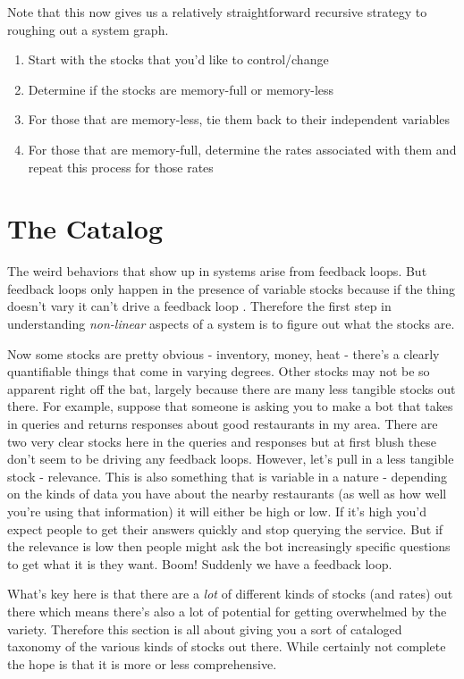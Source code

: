 \documentclass[11pt,a5paper]{book}
\begin{document}
Note that this now gives us a relatively straightforward recursive strategy to roughing out a system graph. 

\begin{enumerate}
\item Start with the stocks that you'd like to control/change
\item Determine if the stocks are memory-full or memory-less
\item For those that are memory-less, tie them back to their independent variables
\item For those that are memory-full, determine the rates associated with them and repeat this process for those rates
\end{enumerate}

\section{The Catalog}
The weird behaviors that show up in systems arise from feedback loops. But feedback loops only happen in the presence of variable stocks because if the thing doesn't vary it can't drive a feedback loop \cite{meadows}. Therefore the first step in understanding \textit{non-linear} aspects of a system is to figure out what the stocks are.
\newline

Now some stocks are pretty obvious - inventory, money, heat - there's a clearly quantifiable things that come in varying degrees. Other stocks may not be so apparent right off the bat, largely because there are many less tangible stocks out there. For example, suppose that someone is asking you to make a bot that takes in queries and returns responses  about good restaurants in my area. There are two very clear stocks here in the queries and responses but at first blush these don't seem to be driving any feedback loops. However, let's pull in a less tangible stock - relevance. This is also something that is variable in a nature - depending on the kinds of data you have about the nearby restaurants (as well as how well you're using that information) it will either be high or low. If it's high you'd expect people to get their answers quickly and stop querying the service. But if the relevance is low then people might ask the bot increasingly specific questions to get what it is they want. Boom! Suddenly we have a feedback loop. 
\newline

What's key here is that there are a \textit{lot} of different kinds of stocks (and rates) out there which means there's also a lot of potential for getting overwhelmed by the variety. Therefore this section is all about giving you a sort of cataloged taxonomy of the various kinds of stocks out there. While certainly not complete the hope is that it is more or less comprehensive. 
\end{document}
